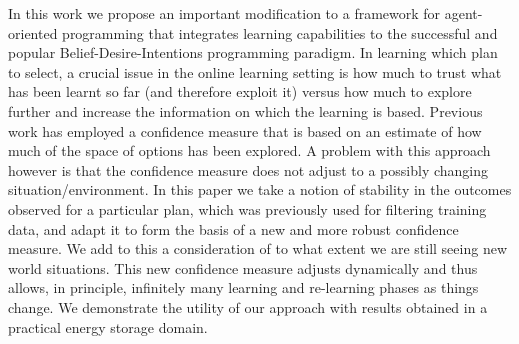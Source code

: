 In this work we propose an important modification to a framework for
agent-oriented programming that integrates 
learning capabilities to the successful and popular
Belief-Desire-Intentions programming paradigm.
In learning which plan to select, a 
crucial issue in the online learning setting is how much to trust what
has been learnt so far (and therefore exploit it) versus how much to
explore further and increase the information on which the learning is
based. 
Previous work has employed a confidence measure that is based on an
estimate of how much of the space of options has been explored. A
problem with this approach however is that the confidence measure does
not adjust to a possibly changing situation/environment. In this paper
we take a notion of stability in the outcomes observed for a
particular plan, which was previously used for filtering training
data, and adapt it to form the basis of a new and more robust
confidence measure. We add to this a consideration of to what extent
we are still seeing new world situations.
This new confidence measure adjusts dynamically and thus allows, in
principle, infinitely many learning and re-learning phases as things change.
We demonstrate the utility of our approach with results obtained in a
practical energy storage domain. 


